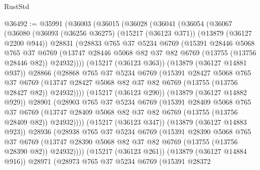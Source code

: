 \begin{lexlean}{RustStd}
\begin{coremodule}
@36492 := @35991
    (@36003
      (@36015
        (@36028
          (@36041
            (@36054
              (@36067
                (@36080
                  (@36093
                    (@36256 @36275)
                    (@15217 (@36123 @371))
                    (@13879 (@36127 @2200 @944))
                    @28831
                    (@28833
                      @765
                      @37
                      @5234
                      @6769
                      (@15391
                        @28446
                        @5068
                        @765
                        @37
                        @6769
                        (@13747
                          @28446
                          @5068
                          @82
                          @37
                          @82
                          @6769
                          (@13755 (@13756 @28446 @82))
                          @24932))))
                  (@15217 (@36123 @363))
                  (@13879 (@36127 @14881 @937))
                  @28866
                  (@28868
                    @765
                    @37
                    @5234
                    @6769
                    (@15391
                      @28427
                      @5068
                      @765
                      @37
                      @6769
                      (@13747 @28427 @5068 @82 @37 @82 @6769 (@13755 (@13756 @28427 @82)) @24932))))
                (@15217 (@36123 @290))
                (@13879 (@36127 @14882 @929))
                @28901
                (@28903
                  @765
                  @37
                  @5234
                  @6769
                  (@15391
                    @28409
                    @5068
                    @765
                    @37
                    @6769
                    (@13747 @28409 @5068 @82 @37 @82 @6769 (@13755 (@13756 @28409 @82)) @24932))))
              (@15217 (@36123 @347))
              (@13879 (@36127 @14883 @923))
              @28936
              (@28938
                @765
                @37
                @5234
                @6769
                (@15391
                  @28390
                  @5068
                  @765
                  @37
                  @6769
                  (@13747 @28390 @5068 @82 @37 @82 @6769 (@13755 (@13756 @28390 @82)) @24932))))
            (@15217 (@36123 @261))
            (@13879 (@36127 @14884 @916))
            @28971
            (@28973
              @765
              @37
              @5234
              @6769
              (@15391
                @28372

\end{coremodule}
\end{lexlean}
